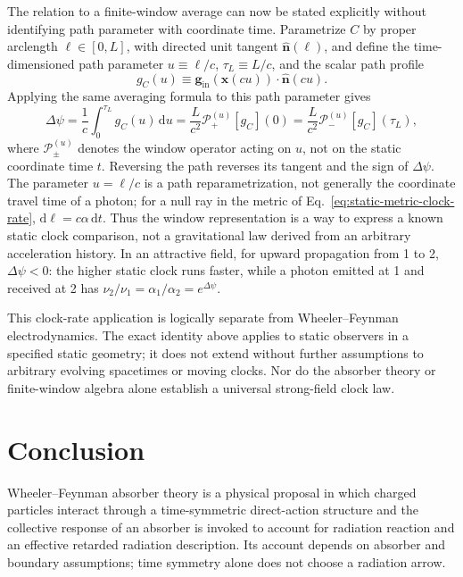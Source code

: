 \documentclass[12pt]{article}
\begin{document}
The relation to a finite-window average can now be stated explicitly without identifying path parameter with coordinate time. Parametrize $C$ by proper arclength $\ell\in[0,L]$, with directed unit tangent $\hat{\mathbf n}(\ell)$, and define the time-dimensioned path parameter $u\equiv\ell/c$, $\tau_L\equiv L/c$, and the scalar path profile
\begin{equation}
  g_C(u)\equiv\mathbf{g}_{\mathrm{in}}\!\left(\mathbf{x}(cu)\right)
  \cdot\hat{\mathbf n}(cu).
  \label{eq:path-field-profile}
\end{equation}
Applying the same averaging formula to this path parameter gives
\begin{equation}
  \Delta\psi
  =\frac{1}{c}\int_0^{\tau_L}g_C(u)\,\mathrm{d}u
  =\frac{L}{c^2}\mathcal{P}_{+}^{(u)}[g_C](0)
  =\frac{L}{c^2}\mathcal{P}_{-}^{(u)}[g_C](\tau_L),
  \label{eq:clock-window-map}
\end{equation}
where $\mathcal{P}_{\pm}^{(u)}$ denotes the window operator acting on $u$, not on the static coordinate time $t$. Reversing the path reverses its tangent and the sign of $\Delta\psi$. The parameter $u=\ell/c$ is a path reparametrization, not generally the coordinate travel time of a photon; for a null ray in the metric of Eq.~\eqref{eq:static-metric-clock-rate}, $\mathrm{d}\ell=c\alpha\,\mathrm{d}t$. Thus the window representation is a way to express a known static clock comparison, not a gravitational law derived from an arbitrary acceleration history. In an attractive field, for upward propagation from 1 to 2, $\Delta\psi<0$: the higher static clock runs faster, while a photon emitted at 1 and received at 2 has $\nu_2/\nu_1=\alpha_1/\alpha_2=e^{\Delta\psi}$.

This clock-rate application is logically separate from Wheeler--Feynman electrodynamics. The exact identity above applies to static observers in a specified static geometry; it does not extend without further assumptions to arbitrary evolving spacetimes or moving clocks. Nor do the absorber theory or finite-window algebra alone establish a universal strong-field clock law.

\section{Conclusion}

Wheeler--Feynman absorber theory is a physical proposal in which charged particles interact through a time-symmetric direct-action structure and the collective response of an absorber is invoked to account for radiation reaction and an effective retarded radiation description. Its account depends on absorber and boundary assumptions; time symmetry alone does not choose a radiation arrow.
\end{document}
